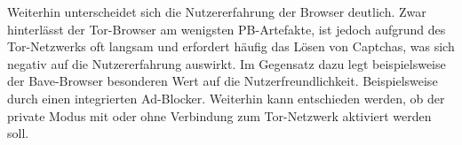 Weiterhin unterscheidet sich die Nutzererfahrung der Browser deutlich.
Zwar hinterlässt der Tor-Browser am wenigsten PB-Artefakte, ist jedoch aufgrund des Tor-Netzwerks oft langsam und erfordert häufig das Lösen von Captchas, was sich negativ auf die Nutzererfahrung auswirkt.
Im Gegensatz dazu legt beispielsweise der Bave-Browser besonderen Wert auf die Nutzerfreundlichkeit. Beispielsweise durch einen integrierten Ad-Blocker. Weiterhin kann entschieden werden, ob der private Modus mit oder ohne Verbindung zum Tor-Netzwerk aktiviert werden soll. \cite{Brave.}

%
%



